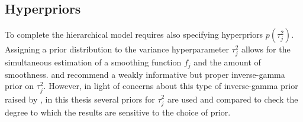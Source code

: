 \subsection{Hyperpriors}
\label{hyperpriors}

To complete the hierarchical model requires also specifying hyperpriors $p(\tau_j^2)$.  Assigning a prior distribution to the variance hyperparameter $\tau_j^2$ allows for the simultaneous estimation of a smoothing function $f_j$ and the amount of smoothness.  and  recommend a weakly informative but proper inverse-gamma prior on $\tau_j^2$. However, in light of concerns about this type of inverse-gamma prior raised by , in this thesis several priors for $\tau^2_j$ are used and compared to check the degree to which the results are sensitive to the choice of prior.

